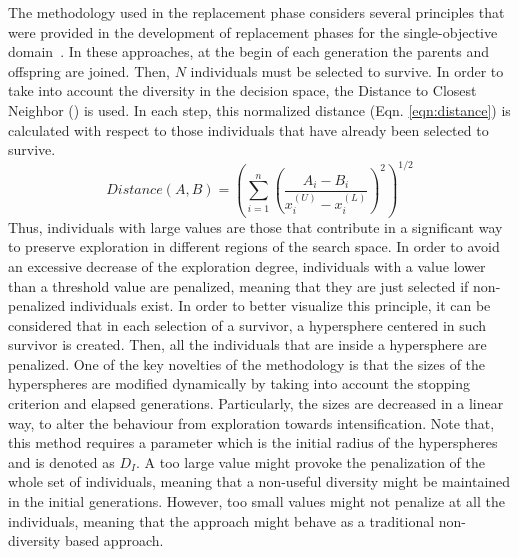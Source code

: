 The methodology used in the replacement phase considers several principles that were provided in the 
development of replacement phases for the single-objective domain~\cite{Joel:MULTI_DYNAMIC}.
%
%
In these approaches, at the begin of each generation the parents and offspring are joined.
%
Then, $N$ individuals must be selected to survive.
%
In order to take into account the diversity in the decision space, the 
Distance to Closest Neighbor (\DCN{}) is used.
%
In each step, this normalized distance (Eqn. \ref{eqn:distance}) is calculated with respect to those individuals that have already been selected to survive.
%
\begin{equation}\label{eqn:distance}
Distance(A, B) = \left (\sum_{i=1}^n \left ( \frac{A_i - B_i}{x_i^{(U)} - x_i^{(L)}} \right )^2  \right)^{1/2}
\end{equation}
Thus, individuals with large \DCN{} values are those that contribute in a significant way to preserve exploration in different regions of the search space.
%
In order to avoid an excessive decrease of the exploration degree, individuals with a \DCN{} value lower than a threshold value are penalized, meaning that
they are just selected if non-penalized individuals exist.
%
In order to better visualize this principle, it can be considered that in each selection of a survivor, a hypersphere centered in such survivor is created.
%
Then, all the individuals that are inside a hypersphere are penalized.
%
One of the key novelties of the methodology is that the sizes of the hyperspheres are modified dynamically by taking into account the stopping criterion
and elapsed generations.
%
Particularly, the sizes are decreased in a linear way, to alter the behaviour from exploration towards intensification.
%
Note that, this method requires a parameter which is the initial radius of the hyperspheres and is denoted as $D_I$. 
%
A too large value might provoke the penalization of the whole set of individuals, meaning that a non-useful diversity might be maintained in the initial generations.
%
However, too small values might not penalize at all the individuals, meaning that the approach might behave as a traditional non-diversity based approach.

